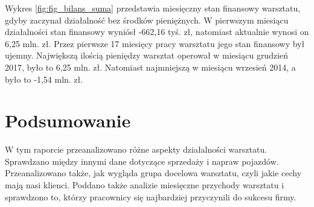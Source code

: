 \documentclass{article}\usepackage[]{graphicx}\usepackage[]{xcolor}
\begin{document}
Wykres \ref{fig:fig_bilans_suma} przedstawia miesięczny stan finansowy warsztatu, gdyby zaczynał działalność bez środków pieniężnych. W pierwszym miesiącu działalności stan finansowy wyniósł -662,16 tyś. zł, natomiast aktualnie wynosi on 6,25 mln. zł. Przez pierwsze 17 miesięcy pracy warsztatu jego stan finansowy był ujemny.
Największą ilością pieniędzy warsztat operował w miesiącu grudzień 2017, było to 6,25 mln. zł.
Natomiast najmniejszą w miesiącu wrzesień 2014, a było to -1,54 mln. zł.

\section{Podsumowanie}
W tym raporcie przeanalizowano różne aspekty działalności warsztatu. Sprawdzano między innymi dane dotyczące sprzedaży i napraw pojazdów. Przeanalizowano także, jak wygląda grupa docelowa warsztatu, czyli jakie cechy mają nasi klienci. Poddano także analizie miesięczne przychody warsztatu i sprawdzono to, którzy pracownicy się najbardziej przyczynili do sukcesu firmy.
\end{document}
